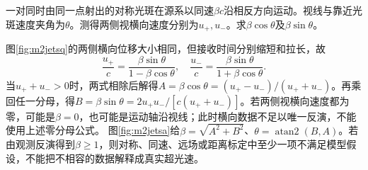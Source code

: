 \begin{exercise}\label{ex:m2oppositejets}
一对同时由同一点射出的对称光斑在源系以同速$\beta c$沿相反方向运动。视线与靠近光斑速度夹角为$\theta$。测得两侧视横向速度分别为$u_+,u_-$。求$\beta\cos\theta$及$\beta\sin\theta$。
\end{exercise}
\begin{solution}
图\ref{fig:m2jetsq}的两侧横向位移大小相同，但接收时间分别缩短和拉长，故
\[
 \frac{u_+}c=\frac{\beta\sin\theta}{1-\beta\cos\theta},\quad
 \frac{u_-}c=\frac{\beta\sin\theta}{1+\beta\cos\theta}.
\]
当$u_++u_->0$时，两式相除后解得$A=\beta\cos\theta=(u_+-u_-)/(u_++u_-)$。再乘回任一分母，得$B=\beta\sin\theta=2u_+u_-/[c(u_++u_-)]$。若两侧视横向速度都为零，可能是$\beta=0$，也可能是运动轴沿视线；此时横向数据不足以唯一反演，不能使用上述零分母公式。
图\ref{fig:m2jetsa}给$\beta=\sqrt{A^2+B^2}$、$\theta=\operatorname{atan2}(B,A)$。若由观测反演得到$\beta\geq1$，则对称、同速、远场或距离标定中至少一项不满足模型假设，不能把不相容的数据解释成真实超光速。
\end{solution}


